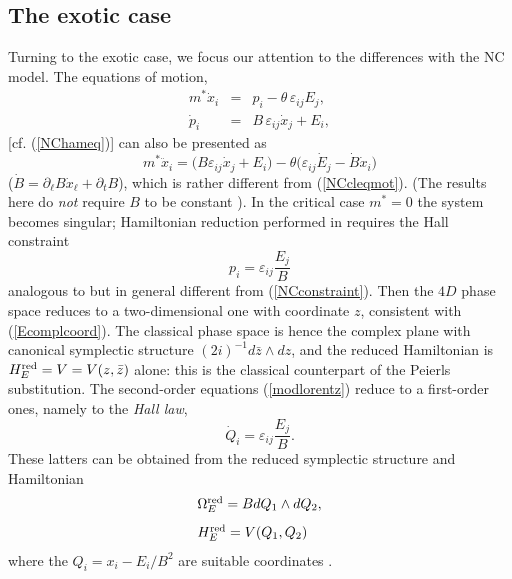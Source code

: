 \documentclass[a4paper,11pt]{article}
\newcommand{\red}{{\rm red}}
\begin{document}
\goodbreak
\subsection{The exotic case}

Turning to the exotic case, we focus our attention to the
differences with the NC model.
The equations of motion,
\begin{equation}
     \begin{array}{rcl}\displaystyle
m^*\dot{x}_{i}
&=&
p_{i}-\displaystyle\theta\,\varepsilon_{ij}E_{j},
\\[8pt]
\displaystyle
\dot{p}_{i}
&=&
B\,\varepsilon_{ij}\dot{x}_{j}+E_{i},
\end{array}
\label{EEL}
\end{equation}
[cf. (\ref{NChameq})] can also be presented as
\begin{equation}
m^*\ddot{x}_i
=
\Big(B\varepsilon_{ij}\dot{x}_j+E_i\Big)
-\theta\Big(\varepsilon_{ij}
\dot{E}_{j}-\dot{B}\dot{x}_{i}\Big)
\label{modlorentz}
\end{equation}
($\dot{B}=\partial_\ell{}B\dot{x}_\ell+\partial_t{}B$),
which is rather different from (\ref{NCcleqmot}).
(The results  here do {\it not} require
$B$ to be constant \cite{DH}).
In the critical case $m^*=0$
the system becomes singular; Hamiltonian reduction \cite{FaJa}
performed in \cite{DH} requires the Hall constraint
\begin{equation}
     p_{i}=\varepsilon_{ij}\frac{E_{j}}{B}
     \label{Hallconstraint}
\end{equation}
analogous to but in general different from (\ref{NCconstraint}).
Then the $4D$
phase space  reduces  to a two-dimensional one with coordinate
$z$, consistent with (\ref{Ecomplcoord}).
The classical phase space is hence the complex plane with
canonical symplectic structure $(2i)^{-1}d\bar{z}\wedge dz$,
and the reduced Hamiltonian is $H_{E}^{\red}=V=V(z, \bar{z})$ alone:
this is the classical counterpart of the Peierls substitution.
The second-order equations (\ref{modlorentz})
reduce to a first-order ones, namely to the {\it Hall law},
\begin{equation}
     \dot{Q}_{i}=\varepsilon_{ij}\frac{E_{j}}{B}.
\label{Hallaw}
\end{equation}
These latters can be obtained
from the reduced symplectic structure and Hamiltonian
\begin{equation}
     \begin{array}{ll}
     \Omega_{E}^{\red}=BdQ_{1}\wedge dQ_{2},
     \hfill\\[8pt]
     H_{E}^{\red}=V(Q_{1}, Q_{2})
     \end{array}
     \label{Eredsympham}
\end{equation}
where the $Q_{i}=x_{i}-E_{i}/B^2$ are suitable coordinates \cite{DH}.
\end{document}
